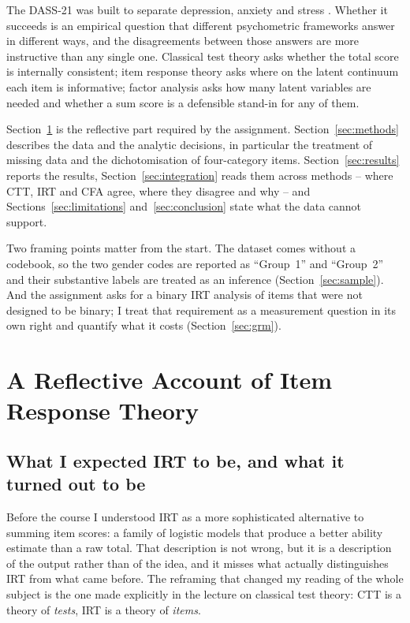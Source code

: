 \documentclass[11pt,a4paper]{article}
\begin{document}
The DASS-21 was built to separate depression, anxiety and stress
\citep{lovibond1995structure}. Whether it succeeds is an empirical question that
different psychometric frameworks answer in different ways, and the disagreements
between those answers are more instructive than any single one. Classical test
theory asks whether the total score is internally consistent; item response theory
asks where on the latent continuum each item is informative; factor analysis asks
how many latent variables are needed and whether a sum score is a defensible stand-in
for any of them.

Section~\ref{sec:theory} is the reflective part required by the assignment.
Section~\ref{sec:methods} describes the data and the analytic decisions, in
particular the treatment of missing data and the dichotomisation of four-category
items. Section~\ref{sec:results} reports the results, Section~\ref{sec:integration}
reads them across methods -- where CTT, IRT and CFA agree, where they disagree and
why -- and Sections~\ref{sec:limitations} and~\ref{sec:conclusion} state what the
data cannot support.

Two framing points matter from the start. The dataset comes without a codebook, so the
two gender codes are reported as ``Group~1'' and ``Group~2'' and their substantive
labels are treated as an inference (Section~\ref{sec:sample}). And the assignment
asks for a binary IRT analysis of items that were not designed to be binary; I treat
that requirement as a measurement question in its own right and quantify what it
costs (Section~\ref{sec:grm}).


\section{A Reflective Account of Item Response Theory}\label{sec:theory}

\subsection{What I expected IRT to be, and what it turned out to be}

Before the course I understood IRT as a more sophisticated alternative to summing
item scores: a family of logistic models that produce a better ability estimate
than a raw total. That description is not wrong, but it is a description of the
output rather than of the idea, and it misses what actually distinguishes IRT from
what came before. The reframing that changed my reading of the whole subject is
the one made explicitly in the lecture on classical test theory: CTT is a theory
of \emph{tests}, IRT is a theory of \emph{items}.
\end{document}
